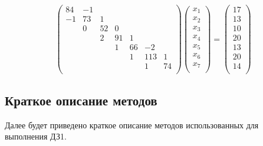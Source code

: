 \documentclass[12pt, a4paper]{article}
\begin{document}
\begin{equation*}
\begin{pmatrix}
84 & -1 &   &   &   &   &   \\
-1 & 73 & 1 &   &   &   &   \\
  & 0 & 52 & 0 &   &   &   \\
  &   & 2 & 91 & 1 &   &   \\
  &   &   & 1 & 66 & -2 &   \\
  &   &   &   & 1 & 113 & 1 \\
  &   &   &   &   & 1 & 74 \\
\end{pmatrix}
\begin{pmatrix}
x_1 \\
x_2 \\
x_3 \\
x_4 \\
x_5 \\
x_6 \\
x_7 \\
\end{pmatrix}
=
\begin{pmatrix}
17 \\
13 \\
10 \\
20 \\
13 \\
20 \\
14 \\
\end{pmatrix}
\end{equation*}
	\newpage
	\begin{center}
		\section*{Краткое описание методов} 
	\end{center}
	\newline Далее будет приведено краткое описание методов использованных для выполнения ДЗ1.\
\end{document}
